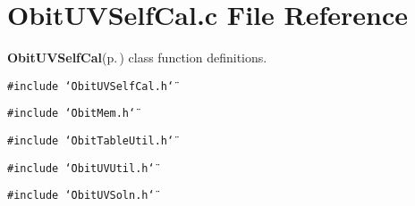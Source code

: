 \section{Obit\-UVSelf\-Cal.c File Reference}
\label{ObitUVSelfCal_8c}
{\bf Obit\-UVSelf\-Cal}{\rm (p.\,\pageref{structObitUVSelfCal})} class function definitions. 

{\tt \#include \char`\"{}Obit\-UVSelf\-Cal.h\char`\"{}}\par
{\tt \#include \char`\"{}Obit\-Mem.h\char`\"{}}\par
{\tt \#include \char`\"{}Obit\-Table\-Util.h\char`\"{}}\par
{\tt \#include \char`\"{}Obit\-UVUtil.h\char`\"{}}\par
{\tt \#include \char`\"{}Obit\-UVSoln.h\char`\"{}}\par
